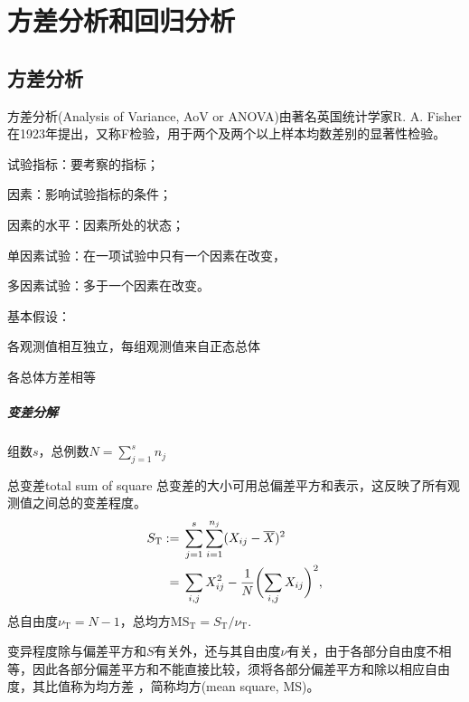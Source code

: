 \chapter{方差分析和回归分析}

\section{方差分析}

方差分析(Analysis of Variance, AoV or ANOVA)由著名英国统计学家R. A. Fisher在1923年提出，又称F检验，用于两个及两个以上样本均数差别的显著性检验。

\begin{definition}{}{}
	试验指标：要考察的指标；

	因素：影响试验指标的条件；

	因素的水平：因素所处的状态；
	
	单因素试验：在一项试验中只有一个因素在改变，

	多因素试验：多于一个因素在改变。
\end{definition}

基本假设：
\begin{compactenum}
	\item 各观测值相互独立，每组观测值来自正态总体
	\item 各总体方差相等
\end{compactenum}

\paragraph{变差分解}

组数$s$，总例数$N = \textstyle\sum_{j=1}^sn_j$

\begin{definition}{总变差}{total sum of square}
	总变差的大小可用总偏差平方和表示，这反映了所有观测值之间总的变差程度。
	\begin{subequations}
		\begin{align}
			S_{\mathrm T} := {}&\sum_{j=1}^s\sum_{i=1}^{n_j}(X_{ij} - \overline{X})^2\\\notag
			= {}&\sum_{i,j}X_{ij}^2 - \frac1N\biggl(\sum_{i,j}X_{ij}\biggr)^2,
		\end{align}
	\end{subequations}
	总自由度$\nu_{\mathrm T} = N - 1$，总均方$\mathrm{MS}_{\mathrm T} = S_{\mathrm T}/\nu_{\mathrm T}.$
\end{definition}

变异程度除与偏差平方和$S$有关外，还与其自由度$\nu$有关，由于各部分自由度不相等，因此各部分偏差平方和不能直接比较，须将各部分偏差平方和除以相应自由度，其比值称为均方差 ，简称均方(mean square, MS)。

